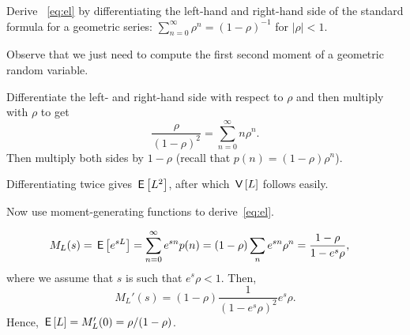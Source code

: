 \begin{exercise} 
Derive ~\cref{eq:el} by differentiating the left-hand and right-hand side of
 the standard formula for a geometric series: $\sum_{n=0}^{\infty}\rho^n = (1-\rho)^{-1}$ for $|\rho| < 1$. 
\begin{hint}
 Observe that we just need to compute the first second moment of a geometric random variable.
\end{hint}
\begin{solution}
Differentiate the left- and right-hand side with respect to
$\rho$ and then multiply with $\rho$ to get
\begin{equation*}
\dfrac{\rho}{(1-\rho)^2}=\sum_{n=0}^{\infty}n\rho^n.
\end{equation*}
Then multiply both sides by $1-\rho$ (recall that $p(n) = (1-\rho)\rho^n$).

Differentiating twice gives $\,\mathsf{E}\left[L^2\right]$, after which $\,\mathsf{V}\left[L\right]$ follows easily.
\end{solution}
\end{exercise}

\begin{extra}
 Now use moment-generating functions to derive~\cref{eq:el}. 
\begin{solution}
\begin{equation*}
 \begin{split}
 M_L(s) 
&= \,\mathsf{E}\left[e^{s L}\right] = \sum_{n=0}^\infty e^{s n}p(n) = (1-\rho) \sum_n e^{s n} \rho^n=\frac{1-\rho}{1-e^{s}\rho},
 \end{split}
\end{equation*}
where we assume that $s$ is such that $e^s \rho < 1$. Then, 
\begin{equation*}
 M_L'(s) = (1-\rho) \frac{1}{(1-e^s\rho)^2} e^s \rho.
\end{equation*}
Hence, $\,\mathsf{E}\left[L\right] = M_L'(0) = \rho/(1-\rho)$.
\end{solution}
\end{extra}




